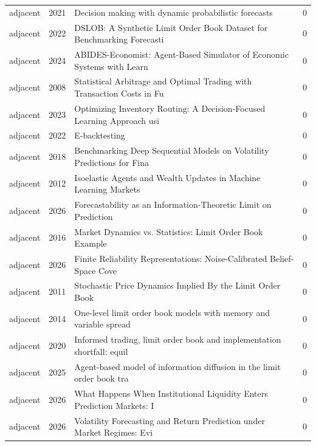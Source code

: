 \begin{longtable}{llp{9.2cm}r}
adjacent & 2021 & Decision making with dynamic probabilistic forecasts~\citep{tankov2021decision} & 0 \\
adjacent & 2022 & DSLOB: A Synthetic Limit Order Book Dataset for Benchmarking Forecasti~\citep{cao2022dslob} & 0 \\
adjacent & 2024 & ABIDES-Economist: Agent-Based Simulator of Economic Systems with Learn~\citep{dwarakanath2024abides} & 0 \\
adjacent & 2008 & Statistical Arbitrage and Optimal Trading with Transaction Costs in Fu~\citep{tsagaris2008statistical} & 0 \\
adjacent & 2023 & Optimizing Inventory Routing: A Decision-Focused Learning Approach usi~\citep{islam2023optimizing} & 0 \\
adjacent & 2022 & E-backtesting~\citep{wang2022e} & 0 \\
adjacent & 2018 & Benchmarking Deep Sequential Models on Volatility Predictions for Fina~\citep{zhang2018benchmarking} & 0 \\
adjacent & 2012 & Isoelastic Agents and Wealth Updates in Machine Learning Markets~\citep{storkey2012isoelastic} & 0 \\
adjacent & 2026 & Forecastability as an Information-Theoretic Limit on Prediction~\citep{maurice2026forecastability} & 0 \\
adjacent & 2016 & Market Dynamics vs. Statistics: Limit Order Book Example~\citep{malyshkin2016market} & 0 \\
adjacent & 2026 & Finite Reliability Representations: Noise-Calibrated Belief-Space Cove~\citep{yoon2026finite} & 0 \\
adjacent & 2011 & Stochastic Price Dynamics Implied By the Limit Order Book~\citep{langnau2011stochastic} & 0 \\
adjacent & 2014 & One-level limit order book models with memory and variable spread~\citep{chavezcasillas2014one} & 0 \\
adjacent & 2020 & Informed trading, limit order book and implementation shortfall: equil~\citep{cetin2020informed} & 0 \\
adjacent & 2025 & Agent-based model of information diffusion in the limit order book tra~\citep{wilinski2025agent} & 0 \\
adjacent & 2026 & What Happens When Institutional Liquidity Enters Prediction Markets: I~\citep{dalen2026happens} & 0 \\
adjacent & 2026 & Volatility Forecasting and Return Prediction under Market Regimes: Evi~\citep{fang2026volatility} & 0 \\

\end{longtable}
